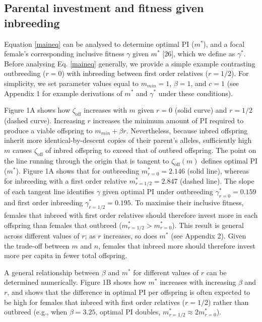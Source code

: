 \documentclass[12pt]{article}
\begin{document}
\subsection*{Parental investment and fitness given inbreeding}

Equation \ref{maineq} can be analysed to determine optimal PI ($m^{*}$), and a focal female's corresponding inclusive fitness $\gamma$ given $m^{*}$ [26], which we define as $\gamma^{*}$. Before analysing Eq. \ref{maineq} generally, we provide a simple example contrasting outbreeding ($r=0$) with inbreeding between first order relatives ($r=1/2$). For simplicity, we set parameter values equal to $m_{min}=1$, $\beta=1$, and $c=1$ (see Appendix 1 for example derivations of $m^{*}$ and $\gamma^{*}$ under these conditions).

Figure 1A shows how $\zeta_{\textrm{off}}$ increases with $m$ given $r=0$ (solid curve) and $r=1/2$ (dashed curve). Increasing $r$ increases the minimum amount of PI required to produce a viable offspring to $m_{min}+\beta r$. Nevertheless, because inbred offspring inherit more identical-by-descent copies of their parent's alleles, sufficiently high $m$ causes $\zeta_{\textrm{off}}$ of inbred offspring to exceed that of outbred offspring. The point on the line running through the origin that is tangent to $\zeta_{\textrm{off}}(m)$ defines optimal PI ($m^{*}$). Figure 1A shows that for outbreeding $m^{*}_{r=0}=2.146$ (solid line), whereas for inbreeding with a first order relative $m^{*}_{r=1/2}=2.847$ (dashed line). The slope of each tangent line identifies $\gamma$ given optimal PI under outbreeding $\gamma^{*}_{r=0}=0.159$ and first order inbreeding $\gamma^{*}_{r=1/2}=0.195$. To maximise their inclusive fitness, females that inbreed with first order relatives should therefore invest more in each offspring than females that outbreed ($m^{*}_{r=1/2}>m^{*}_{r=0}$). This result is general across different values of $r$; as $r$ increases, so does $m^{*}$ (see Appendix 2). Given the trade-off between $m$ and $n$, females that inbreed more should therefore invest more per capita in fewer total offspring. 

A general relationship between $\beta$ and $m^{*}$ for different values of $r$ can be determined numerically. Figure 1B shows how $m^{*}$ increases with increasing $\beta$ and $r$, and shows that the difference in optimal PI per offspring is often expected to be high for females that inbreed with first order relatives ($r=1/2$) rather than outbreed (e.g., when $\beta=3.25$, optimal PI doubles, $m^{*}_{r=1/2} \approx 2m^{*}_{r=0}$).
\end{document}
